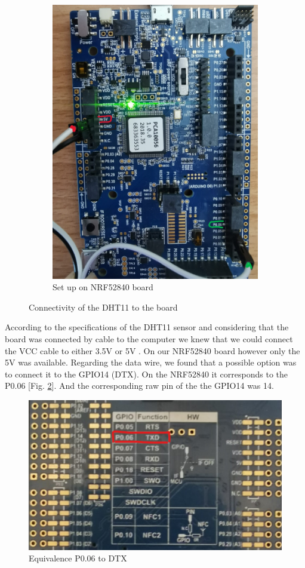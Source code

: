 \begin{figure}
\begin{subfigure}[b]{0.45\columnwidth}
        \includegraphics[width=\columnwidth]{images/ConnectivityToBoard.jpeg}
        \caption{Set up on NRF52840 board}
    \end{subfigure}
    \caption{Connectivity of the DHT11 to the board}
    \label{fig:connectionDHT11}
\end{figure}

According to the specifications of the DHT11 sensor and considering that the board was connected by cable to the computer we
knew that we could connect the VCC cable to either 3.5V or 5V \cite{b1}. On our NRF52840 board however only the 5V was available. 
Regarding the data wire, we found that a possible option was to connect it to the GPIO14 (DTX)\cite{b2}. On the NRF52840 it corresponds to the P0.06 [Fig. \ref{fig:DTX}]. And the corresponding raw pin of the the GPIO14 was 14.

\begin{figure}[!ht]%
    \centering
    \includegraphics[scale=0.2]{images/GPIO14Arduino.jpg}%
    \caption{Equivalence P0.06 to DTX}%
    \label{fig:DTX}%
\end{figure}
